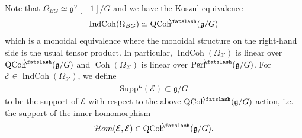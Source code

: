 \documentclass [11pt,oneside,a4paper,mathscr]{amsart}
\theoremstyle{definition}
\newcommand{\QCoh}{\operatorname{QCoh}}
\newcommand{\X}{\mathcal{X}}
\newcommand{\Coh}{\operatorname{Coh}}
\newcommand{\IndCoh}{\operatorname{IndCoh}}
\newcommand{\shear}{{\mathbin{\mkern-6mu\fatslash}}}
\begin{document}
Note that $\Omega_{BG}\simeq \mathfrak{g}^{\vee}[-1]/G$
and we have the Koszul equivalence 
\begin{align*}
    \IndCoh(\Omega_{BG}) \simeq \QCoh^{\shear}(\mathfrak{g}/G)
\end{align*}
which is a monoidal equivalence where the monoidal structure on the right-hand side is 
the usual tensor product. 
In particular, $\IndCoh(\Omega_{\mathcal{X}})$ is linear over $\QCoh^{\shear}(\mathfrak{g}/G)$
and $\Coh(\Omega_{\mathcal{X}})$ is linear over $\mathrm{Perf}^{\shear}(\mathfrak{g}/G)$. 
For $\mathcal{E} \in \IndCoh(\Omega_{\X})$, we define 
\begin{align*}
    \mathrm{Supp}^L(\mathcal{E}) \subset \mathfrak{g}/G
\end{align*}
to be the support of $\mathcal{E}$ with respect to the above 
$\QCoh^{\shear}(\mathfrak{g}/G)$-action, i.e. 
the support of the inner homomorphism 
\begin{align*}\mathcal{H}om(\mathcal{E}, \mathcal{E})\in \QCoh^{\shear}(\mathfrak{g}/G).
\end{align*}
\end{document}
